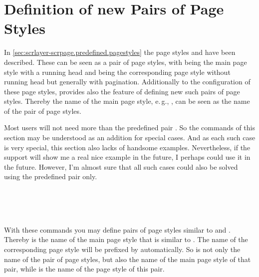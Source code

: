 \section{Definition of new Pairs of Page Styles}
\label{sec:scrlayer-scrpage.pagestyle.pairs}

In \autoref{sec:scrlayer-scrpage.predefined.pagestyles} the page styles
 and  have been
described. These can be seen as a pair of page styles, with
 being the main page style with a running head and
 being the corresponding  page
style without running head but generally with pagination. Additionally to the
configuration of these page styles,  provides also
the feature of defining new such pairs of page styles. Thereby the name of the
main page style, e.\,g., , can be seen as the name of the
pair of page styles.

Most users will not need more than the predefined pair
. So the commands of this section may be understood as
an addition for special cases. And as each such case is very special,
this section also lacks of handsome examples. Nevertheless, if the support
will show me a real nice example in the future, I perhaps could use it in
the future. However, I'm almost sure that all such cases could also be
solved using the predefined pair only.

\begin{Declaration}
  \\
  \\
  \\
\end{Declaration}
%
%
%
%
With these commands you may define pairs of page styles similar to
 and . Thereby
 is the name of the main page style that is similar to
. The name of the corresponding  page
style will be prefixed by  automatically. So  is
not only the name of the pair of page styles, but also the name of the main
page style of that pair, while  is the name of the
 page style of this pair.

